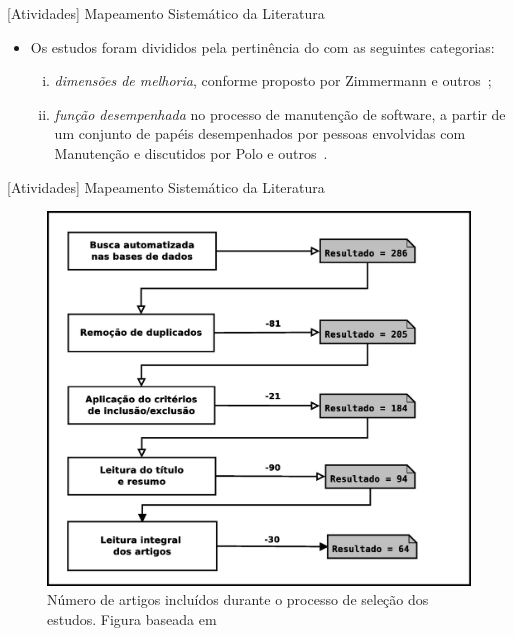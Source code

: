 \documentclass[t,14pt,mathserif]{beamer}
\begin{document}
\begin{frame}{[Atividades] Mapeamento Sistemático da Literatura}

    \begin{itemize}
       \item Os estudos foram divididos pela pertinência do com as seguintes
             categorias:
            \begin{enumerate}[(i)]
                \item \textit{dimensões de melhoria}, conforme proposto por
                    Zimmermann e outros~\cite{zimmermann2009improving};
                \item \textit{função desempenhada} no processo de manutenção de
                    software, a partir de um conjunto de papéis desempenhados
                    por pessoas envolvidas com Manutenção e discutidos por Polo
                    e outros~\cite{Polo1999}.
            \end{enumerate}
   \end{itemize}

\end{frame}

\begin{frame}{[Atividades] Mapeamento Sistemático da Literatura}

            \begin{figure} \centering \includegraphics[width=0.45\linewidth]
        {../img/diagrama-processo-selecao.eps}
        \caption{Número de artigos incluídos durante o processo de seleção dos
            estudos. Figura baseada em~\cite{Petersen2015}}
\label{fig:diagrama-processo-selecao}

    \end{figure}
\end{frame}
\end{document}
